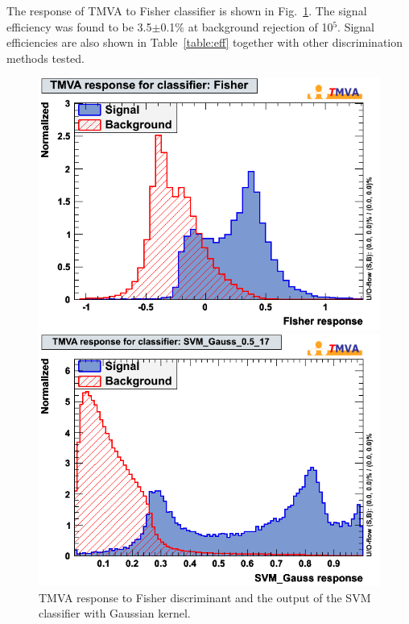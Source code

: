 \documentclass[a4paper]{jpconf}
\begin{document}
The response of TMVA to Fisher classifier is shown in Fig.~\ref{fig:fishersvm}. 
The signal efficiency was found to be 3.5$\pm$0.1\% at background rejection of 10$^5$.
Signal efficiencies are also shown in Table~\ref{table:eff} together with other discrimination methods tested.
 


\begin{figure}[h]
 \begin{minipage}{8.0cm}
\includegraphics[width=1.0\textwidth]{images/mva_Fisher.png}
\end{minipage}
 \hfill
\begin{minipage}{8.0cm}
\includegraphics[width=1.0\textwidth]{images/mk_svm_gauss2.png}



\end{minipage}
\caption{\label{fig:fishersvm}TMVA response to Fisher discriminant and 
the output of the SVM classifier with Gaussian kernel.}
\end{figure}
\end{document}
